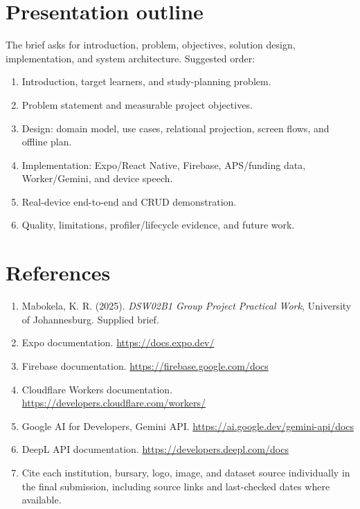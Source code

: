 \documentclass[11pt,a4paper]{article}
\begin{document}
\section{Presentation outline}
The brief asks for introduction, problem, objectives, solution design, implementation, and system architecture. Suggested order:
\begin{enumerate}
\item Introduction, target learners, and study-planning problem.
\item Problem statement and measurable project objectives.
\item Design: domain model, use cases, relational projection, screen flows, and offline plan.
\item Implementation: Expo/React Native, Firebase, APS/funding data, Worker/Gemini, and device speech.
\item Real-device end-to-end and CRUD demonstration.
\item Quality, limitations, profiler/lifecycle evidence, and future work.
\end{enumerate}

\section{References}
\begin{enumerate}
\item Mabokela, K. R. (2025). \emph{DSW02B1 Group Project Practical Work}, University of Johannesburg. Supplied brief.
\item Expo documentation. \url{https://docs.expo.dev/}
\item Firebase documentation. \url{https://firebase.google.com/docs}
\item Cloudflare Workers documentation. \url{https://developers.cloudflare.com/workers/}
\item Google AI for Developers, Gemini API. \url{https://ai.google.dev/gemini-api/docs}
\item DeepL API documentation. \url{https://developers.deepl.com/docs}
\item Cite each institution, bursary, logo, image, and dataset source individually in the final submission, including source links and last-checked dates where available.
\end{enumerate}
\end{document}
